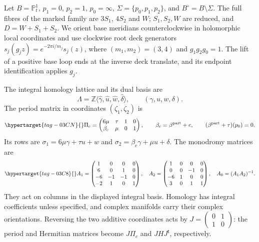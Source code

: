 \begin{definition}
\hypertarget{tag-01O1}{}\label{def:common-conventions}
Let $B=\mathbb P^1_t$, $p_1=0$, $p_2=1$, $p_0=\infty$,
$\Sigma=\{p_0,p_1,p_2\}$, and $B^\circ=B\setminus\Sigma$.
The full fibres of the marked family are $3S_1$, $4S_2$ and $W$;
$S_1,S_2,W$ are reduced, and $D=W+S_1+S_2$.
We orient base meridians counterclockwise in holomorphic local
coordinates and use clockwise root deck generators
$s_j(g_jz)=e^{-2\pi i/m_j}s_j(z)$, where $(m_1,m_2)=(3,4)$ and
$g_1g_2g_0=1$. The lift of a positive base loop ends at the inverse
deck translate, and its endpoint identification applies $g_j$.

The integral homology lattice and its dual basis are
\[
 \Lambda=\mathbb Z\langle\widehat\gamma,\widehat u,
                     \widehat w,\widehat\delta\rangle,
 \qquad (\gamma,u,w,\delta).
\]
The period matrix in coordinates $(\zeta_1,\zeta_2)$ is
\begin{equation}\hypertarget{tag-03CN}{}\label{wb:pshift:eq:periods}
 \Pi_c=\begin{pmatrix}6\mu&\tau&1&0\\
                    \beta_c&\mu&0&1\end{pmatrix},
 \qquad \beta_c=\beta^{\rm part}+c,
 \qquad (\beta^{\rm part}+\tau)(p_0)=0.
\end{equation}
Its rows are $\sigma_1=6\mu\gamma+\tau u+w$ and
$\sigma_2=\beta_c\gamma+\mu u+\delta$. The monodromy matrices are
\begin{equation}\hypertarget{tag-03C8}{}\label{wb:pshift:eq:finite-data}
 A_1=\begin{pmatrix}1&0&0&0\\6&0&1&0\\-6&-1&-1&0\\-2&1&0&1\end{pmatrix},
 \quad A_2=\begin{pmatrix}1&0&0&0\\0&0&-1&0\\-6&1&0&0\\3&0&1&1\end{pmatrix},
 \quad A_0=(A_1A_2)^{-1}.
\end{equation}
They act on columns in the displayed integral basis. Homology has
integral coefficients unless specified, and complex manifolds carry
their complex orientations. Reversing the two additive coordinates
acts by $J=\left(\begin{smallmatrix}0&1\\1&0\end{smallmatrix}\right)$:
the period and Hermitian matrices become $J\Pi_c$ and
$JHJ^{\mathsf t}$, respectively.
\end{definition}